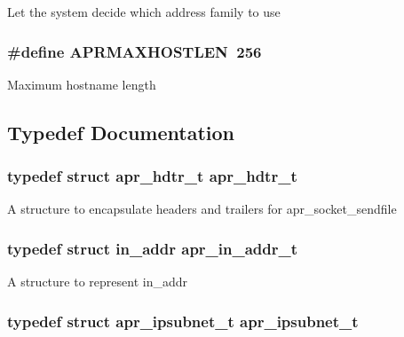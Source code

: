 Let the system decide which address family to use \hypertarget{group__apr__network__io_ga7f5b3882209106bb407b1d518d6ad59d}{
\subsubsection[{A\-P\-R\-M\-A\-X\-H\-O\-S\-T\-L\-E\-N}]{\setlength{\rightskip}{0pt plus 5cm}\#define A\-P\-R\-M\-A\-X\-H\-O\-S\-T\-L\-E\-N~256}}\label{group__apr__network__io_ga7f5b3882209106bb407b1d518d6ad59d}
Maximum hostname length 

\subsection{Typedef Documentation}
\hypertarget{group__apr__network__io_ga97887d5358a9c79c241ccafab61d8ff5}{
\subsubsection[{apr\-\_\-hdtr\-\_\-t}]{\setlength{\rightskip}{0pt plus 5cm}typedef struct {\bf apr\-\_\-hdtr\-\_\-t} {\bf apr\-\_\-hdtr\-\_\-t}}}\label{group__apr__network__io_ga97887d5358a9c79c241ccafab61d8ff5}
A structure to encapsulate headers and trailers for apr\-\_\-socket\-\_\-sendfile \hypertarget{group__apr__network__io_gad30d6c55a354a9a2e0a8747abb0c8176}{
\subsubsection[{apr\-\_\-in\-\_\-addr\-\_\-t}]{\setlength{\rightskip}{0pt plus 5cm}typedef struct in\-\_\-addr {\bf apr\-\_\-in\-\_\-addr\-\_\-t}}}\label{group__apr__network__io_gad30d6c55a354a9a2e0a8747abb0c8176}
A structure to represent in\-\_\-addr \hypertarget{group__apr__network__io_gac86ee04eb80f938902095d1d0a67c324}{
\subsubsection[{apr\-\_\-ipsubnet\-\_\-t}]{\setlength{\rightskip}{0pt plus 5cm}typedef struct {\bf apr\-\_\-ipsubnet\-\_\-t} {\bf apr\-\_\-ipsubnet\-\_\-t}}}\label{group__apr__network__io_gac86ee04eb80f938902095d1d0a67c324}
